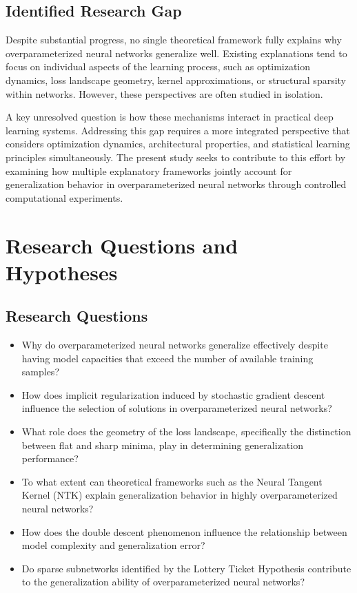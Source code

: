 \documentclass[conference]{IEEEtran}
\begin{document}
\subsection{Identified Research Gap}

Despite substantial progress, no single theoretical framework fully explains why overparameterized neural networks generalize well. Existing explanations tend to focus on individual aspects of the learning process, such as optimization dynamics, loss landscape geometry, kernel approximations, or structural sparsity within networks. However, these perspectives are often studied in isolation.

A key unresolved question is how these mechanisms interact in practical deep learning systems. Addressing this gap requires a more integrated perspective that considers optimization dynamics, architectural properties, and statistical learning principles simultaneously. The present study seeks to contribute to this effort by examining how multiple explanatory frameworks jointly account for generalization behavior in overparameterized neural networks through controlled computational experiments.

\section{Research Questions and Hypotheses}

\subsection{Research Questions}

\begin{itemize}
    \item[\textbf{RQ1.}] Why do overparameterized neural networks generalize effectively despite having model capacities that exceed the number of available training samples?
    \item[\textbf{RQ2.}] How does implicit regularization induced by stochastic gradient descent influence the selection of solutions in overparameterized neural networks?
    \item[\textbf{RQ3.}] What role does the geometry of the loss landscape, specifically the distinction between flat and sharp minima, play in determining generalization performance?
    \item[\textbf{RQ4.}] To what extent can theoretical frameworks such as the Neural Tangent Kernel (NTK) explain generalization behavior in highly overparameterized neural networks?
    \item[\textbf{RQ5.}] How does the double descent phenomenon influence the relationship between model complexity and generalization error?
    \item[\textbf{RQ6.}] Do sparse subnetworks identified by the Lottery Ticket Hypothesis contribute to the generalization ability of overparameterized neural networks?
\end{itemize}
\end{document}
